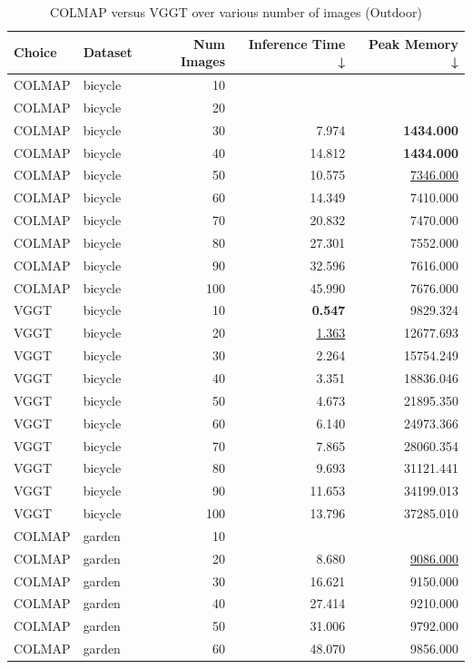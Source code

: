 \begin{table}[H]
\caption{\ifdefined\customcaption \customcaption \else COLMAP versus VGGT over various number of images (Outdoor) \fi}
\label{tab:01_num_images_timing_outdoor}
\centering
\scriptsize
\begin{tabular}{llrrr}
\toprule
Choice & Dataset & Num Images & Inference Time ↓ & Peak Memory ↓ \\
\midrule
COLMAP & bicycle & 10 &  &  \\
COLMAP & bicycle & 20 &  &  \\
COLMAP & bicycle & 30 & 7.974 & \textbf{1434.000} \\
COLMAP & bicycle & 40 & 14.812 & \textbf{1434.000} \\
COLMAP & bicycle & 50 & 10.575 & \underline{7346.000} \\
COLMAP & bicycle & 60 & 14.349 & 7410.000 \\
COLMAP & bicycle & 70 & 20.832 & 7470.000 \\
COLMAP & bicycle & 80 & 27.301 & 7552.000 \\
COLMAP & bicycle & 90 & 32.596 & 7616.000 \\
COLMAP & bicycle & 100 & 45.990 & 7676.000 \\
VGGT & bicycle & 10 & \textbf{0.547} & 9829.324 \\
VGGT & bicycle & 20 & \underline{1.363} & 12677.693 \\
VGGT & bicycle & 30 & 2.264 & 15754.249 \\
VGGT & bicycle & 40 & 3.351 & 18836.046 \\
VGGT & bicycle & 50 & 4.673 & 21895.350 \\
VGGT & bicycle & 60 & 6.140 & 24973.366 \\
VGGT & bicycle & 70 & 7.865 & 28060.354 \\
VGGT & bicycle & 80 & 9.693 & 31121.441 \\
VGGT & bicycle & 90 & 11.653 & 34199.013 \\
VGGT & bicycle & 100 & 13.796 & 37285.010 \\
\midrule
COLMAP & garden & 10 &  &  \\
COLMAP & garden & 20 & 8.680 & \underline{9086.000} \\
COLMAP & garden & 30 & 16.621 & 9150.000 \\
COLMAP & garden & 40 & 27.414 & 9210.000 \\
COLMAP & garden & 50 & 31.006 & 9792.000 \\
COLMAP & garden & 60 & 48.070 & 9856.000 \\

\end{tabular}
\end{table}
